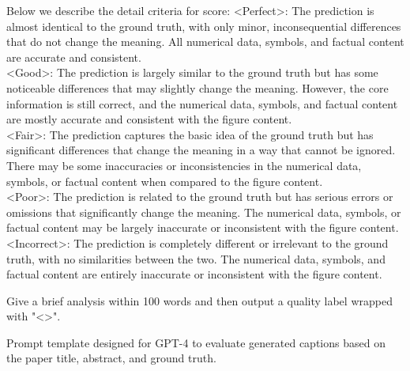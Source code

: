 \begin{table*}[t!]
\begin{tcolorbox}
Below we describe the detail criteria for score:
<Perfect>: The prediction is almost identical to the ground truth, with only minor, inconsequential differences that do not change the meaning. All numerical data, symbols, and factual content are accurate and consistent.\\
<Good>: The prediction is largely similar to the ground truth but has some noticeable differences that may slightly change the meaning. However, the core information is still correct, and the numerical data, symbols, and factual content are mostly accurate and consistent with the figure content.\\
<Fair>: The prediction captures the basic idea of the ground truth but has significant differences that change the meaning in a way that cannot be ignored. There may be some inaccuracies or inconsistencies in the numerical data, symbols, or factual content when compared to the figure content.\\
<Poor>: The prediction is related to the ground truth but has serious errors or omissions that significantly change the meaning. The numerical data, symbols, or factual content may be largely inaccurate or inconsistent with the figure content.\\
<Incorrect>: The prediction is completely different or irrelevant to the ground truth, with no similarities between the two. The numerical data, symbols, and factual content are entirely inaccurate or inconsistent with the figure content.

Give a brief analysis within 100 words and then output a quality label wrapped with "<>".
    \end{tcolorbox}
    \caption{Prompt template designed for GPT-4 to evaluate generated captions based on the paper title, abstract, and ground truth.}
    \label{tab:prompt_for_gpt4_score_caption}
\end{table*}

\begin{table}[t!]
    \centering
    \small  
    \caption{Results of 500 single-figure captions generated by various models.}
    \label{tab:gpt4_score_single_caption}
\end{table}

